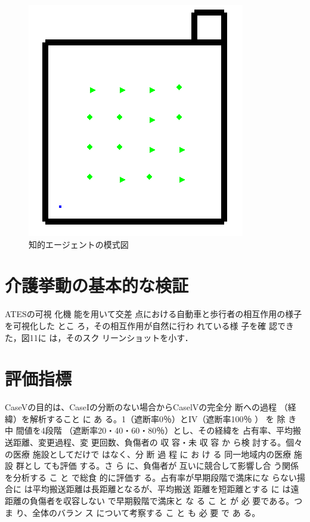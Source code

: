 \begin{figure}[htb]
\begin{center}
 \includegraphics[scale=0.6]{figures/dementia_urinate_v1.png}
 \caption[知的エージェントの模式図]{知的エージェントの模式図 \label{dementia_urinate_v1}}
\end{center}
\end{figure}

\section{介護挙動の基本的な検証}

ATESの可視 化機 能を用いて交差 点における自動車と歩行者の相互作用の様子を可視化した とこ ろ，その相互作用が自然に行わ れている様 子を確 認できた，図11に は，そのスク リーンショットを小す．

\section{評価指標}

CaseVの目的は、CaseIの分断のない場合からCaselVの完全分 断への過程 （経緯）を解析すること に あ る。1（遮断率0％）とIV（遮断率100％ ） を 除 き 中 間値を4段階 （遮断率20・40・60・80％）とし、その経緯を 占有率、平均搬送距離、変更過程、変 更回数、負傷者の 収 容・未 収 容 か ら検 討する。個々の医療 施設としてだけで はなく、分 断 過 程 に お け る 同一地域内の医療 施設 群とし ても評価 する。さ ら に、負傷者が 互いに競合して影響し合 う関係 を分析する こ と で総食 的に評価す る。占有率が早期段階で満床にな らない揚合に は平均搬送距離は長距離となるが、平均搬送 距離を短距離とする に は遠距離の負傷者を収容しない で早期毅階で満床と な る こ と が 必 要である。つま り、全体のバラン ス について考察する こ と も 必 要 で あ る。

